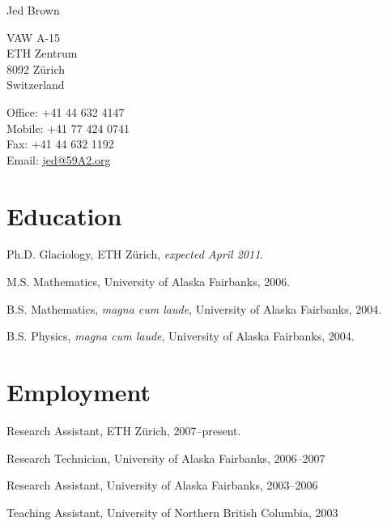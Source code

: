 \documentclass[10pt,letterpaper]{article}
\def\name{Jed Brown}
\renewenvironment{itemize}{
  \begin{list}{}{
    \setlength{\leftmargin}{1.5em}
    \setlength{\itemsep}{0.25em}
    \setlength{\parskip}{0pt}
    \setlength{\parsep}{0.25em}
  }
}{
  \end{list}
}
\begin{document}
{\LARGE \name}


\bigskip

\begin{minipage}[t]{0.5\textwidth}
  VAW A-15 \\
  ETH Zentrum \\
  8092 Z\"urich \\
  Switzerland
\end{minipage}
\begin{minipage}[t]{0.5\textwidth}
  Office: +41 44 632 4147 \\
  Mobile: +41 77 424 0741 \\
  Fax: +41 44 632 1192 \\
  Email: \url{jed@59A2.org}
\end{minipage}

\section*{Education}

\begin{itemize}
\item Ph.D. Glaciology, ETH Z\"urich, {\it expected April 2011}.
\item M.S. Mathematics, University of Alaska Fairbanks, 2006.
\item B.S. Mathematics, {\it magna cum laude}, University of Alaska Fairbanks, 2004.
\item B.S. Physics, {\it magna cum laude}, University of Alaska Fairbanks, 2004.
\end{itemize}

\section*{Employment}
\begin{itemize}
\item Research Assistant, ETH Z\"urich, 2007--present.
\item Research Technician, University of Alaska Fairbanks, 2006--2007
\item Research Assistant, University of Alaska Fairbanks, 2003--2006
\item Teaching Assistant, University of Northern British Columbia, 2003
\end{itemize}
\end{document}
